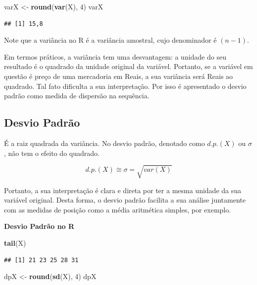 \documentclass[
]{book}
\newenvironment{Shaded}{\begin{snugshade}}{\end{snugshade}}
\newcommand{\DecValTok}[1]{\textcolor[rgb]{0.00,0.00,0.81}{#1}}
\newcommand{\KeywordTok}[1]{\textcolor[rgb]{0.13,0.29,0.53}{\textbf{#1}}}
\newcommand{\NormalTok}[1]{#1}
\newcommand{\StringTok}[1]{\textcolor[rgb]{0.31,0.60,0.02}{#1}}
\begin{document}
\begin{Shaded}
\begin{Highlighting}[]
\NormalTok{varX <-}\StringTok{ }\KeywordTok{round}\NormalTok{(}\KeywordTok{var}\NormalTok{(X), }\DecValTok{4}\NormalTok{)}
\NormalTok{varX}
\end{Highlighting}
\end{Shaded}

\begin{verbatim}
## [1] 15,8
\end{verbatim}

Note que a variância no R é a variância amostral, cujo denominador é \((n-1)\).

Em termos práticos, a variância tem uma desvantagem: a unidade do seu resultado é o quadrado da unidade original da variável. Portanto, se a variável em questão é preço de uma mercadoria em Reais, a sua variância será Reais ao quadrado. Tal fato dificulta a sua interpretação. Por isso é apresentado o desvio padrão como medida de dispersão na sequência.

\hypertarget{desvio-padruxe3o}{%
\subsection{Desvio Padrão}\label{desvio-padruxe3o}}

É a raiz quadrada da variância. No desvio padrão, denotado como \(d.p.(X)\) ou
\(\sigma\), não tem o efeito do quadrado.

\begin{equation*}
  d.p.(X) \cong \sigma = \sqrt{var(X)}
\end{equation*}

Portanto, a sua interpretação é clara e direta por ter a mesma unidade da sua variável original. Desta forma, o desvio padrão facilita a sua análise juntamente com as medidas de posição como a média aritmética simples, por exemplo.

\textbf{Desvio Padrão no R}

\begin{Shaded}
\begin{Highlighting}[]
\KeywordTok{tail}\NormalTok{(X)}
\end{Highlighting}
\end{Shaded}

\begin{verbatim}
## [1] 21 23 25 28 31
\end{verbatim}

\begin{Shaded}
\begin{Highlighting}[]
\NormalTok{dpX <-}\StringTok{ }\KeywordTok{round}\NormalTok{(}\KeywordTok{sd}\NormalTok{(X), }\DecValTok{4}\NormalTok{)}
\NormalTok{dpX}
\end{Highlighting}
\end{Shaded}
\end{document}

